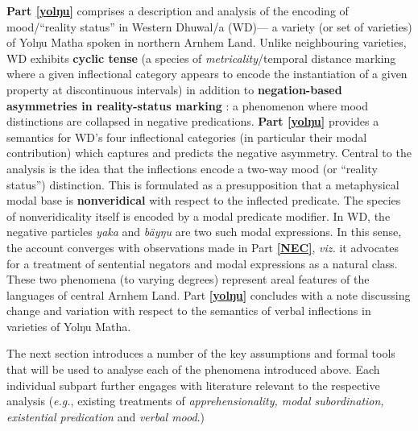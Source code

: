 \documentclass[12pt,dvipsnames]{report}
\begin{document}
 
\textbf{Part \ref{yolŋu}} comprises a description and analysis of the encoding of mood/``reality status'' in Western Dhuwal/a (WD)--- a variety (or set of varieties) of Yolŋu Matha spoken in northern Arnhem Land. Unlike neighbouring varieties, WD exhibits \textbf{cyclic tense} (a species of \textit{metricality}/temporal distance marking where a given inflectional category appears to encode the instantiation of a given property at discontinuous intervals) in addition to \textbf{negation-based asymmetries in reality-status marking} \citep[\textit{cf.}][]{Miestamo2005}: a phenomenon where mood distinctions are collapsed in negative predications. \textbf{Part \ref{yolŋu}} provides a semantics for WD's four inflectional categories (in particular their modal contribution) which captures and predicts the negative asymmetry. Central to the analysis is the idea that the inflections encode a two-way mood (or ``reality status'') distinction. This is formulated as a presupposition that a metaphysical modal base is \textbf{nonveridical} with respect to the inflected predicate. The species of nonveridicality itself is encoded by a modal predicate modifier. In WD, the negative particles \textit{yaka} and \textit{bäyŋu} are two such modal expressions. In this sense, the account converges with observations made in Part \textbf{\ref{NEC}}, \textit{viz.} it advocates for a treatment of sentential negators and modal expressions as a natural class. These two phenomena (to varying degrees) represent areal features of the languages of central Arnhem Land. Part \textbf{\ref{yolŋu}} concludes with a note discussing change and variation with respect to the semantics of verbal inflections in varieties of Yolŋu Matha.


The next section introduces a number of the key assumptions and formal tools that will be used to analyse each of the phenomena introduced above. Each individual subpart further engages with literature relevant to the respective analysis (\textit{e.g.}, existing treatments of \textit{apprehensionality, modal subordination, existential predication} and \textit{verbal mood}.)
\end{document}
